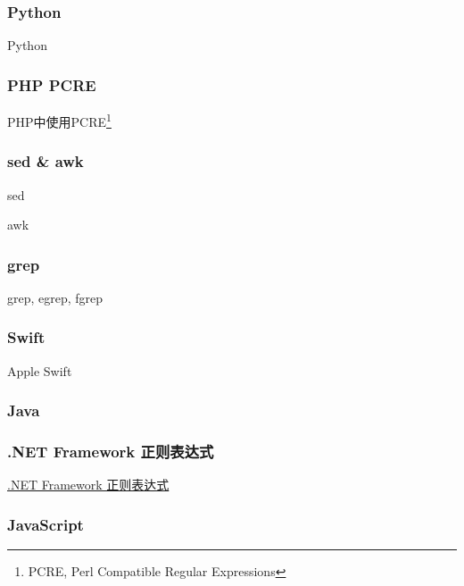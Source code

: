 \documentclass[12pt,a4paper,twoside]{ctexart}
\begin{document}
%

\subsubsection{Python}
\label{sec:python}

Python

\subsubsection{PHP PCRE}
\label{sec:php-pcre}

PHP中使用PCRE\footnote{PCRE, Perl Compatible Regular Expressions} \par

\subsubsection{sed \& awk}
\label{sec:sed-awk}

sed \par

awk \par

\subsubsection{grep}
\label{sec:grep}

grep, egrep, fgrep \par

\subsubsection{Swift}
\label{sec:swift}

Apple Swift

\subsubsection{Java}
\label{sec:java}

\subsubsection{.NET Framework 正则表达式}
\label{sec:dotnet-regex}

\href{https://msdn.microsoft.com/zh-cn/library/az24scfc.aspx}{.NET Framework 正则表达式}


\subsubsection{JavaScript}
\label{sec:javascript}
\end{document}
